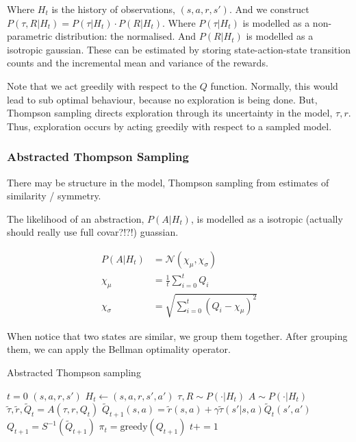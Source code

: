 Where $H_t$ is the history of observations, $(s, a, r, s')$.
And we construct $P(\tau, R | H_t) = P(\tau | H_t) \cdot P(R | H_t)$. Where $P(\tau | H_t)$
is modelled as a non-parametric distribution: the normalised.
And $P(R | H_t)$ is modelled as a isotropic gaussian.
These can be estimated by storing state-action-state transition counts
and the incremental mean and variance of the rewards.

Note that we act greedily with respect to the $Q$ function. Normally, this would
lead to sub optimal behaviour, because no exploration is being done. But, Thompson sampling
directs exploration through its uncertainty in the model, $\tau, r$. Thus,
exploration occurs by acting greedily with respect to a sampled model.

\subsubsection{Abstracted Thompson Sampling}

There may be structure in the model,
Thompson sampling from estimates of similarity / symmetry.

The likelihood of an abstraction, $P(A|H_t)$, is modelled as a isotropic (actually should really use full covar?!?!) guassian.

\begin{align*}
	P(A|H_t) &= \mathcal N(\chi_{\mu}, \chi_{\sigma}) \\
	\chi_{\mu} &= \frac{1}{t}\sum_{i=0}^t Q_i \tag{mean} \\
	\chi_{\sigma} &= \sqrt{\sum_{i=0}^t (Q_i - \chi_{\mu})^2} \tag{standard deviation}
\end{align*}

When notice that two states are similar, we group them together. After grouping them, we can apply the Bellman optimality operator.

\begin{algorithm}
	\caption{Abstracted Thompson sampling}
	\begin{algorithmic}[1]

		\State $t=0$
		\State $(s, a, r, s')$ 
		\State $H_t \leftarrow (s, a, r, s', a')$ 
		\State $\tau, R \sim P(\cdot | H_t)$ 
		\State $A \sim P(\cdot | H_t)$ 
		\State $\tilde \tau, \tilde r, \tilde Q_t = A(\tau, r, Q_t)$ 
		\State $\tilde Q_{t+1}(s, a) = \tilde r(s, a) + \gamma \tilde \tau(s'| s, a) \tilde Q_t(s', a')$ 
		\State $Q_{t+1} = S^{-1}(\tilde Q_{t+1})$ 
		\State $\pi_t = \text{greedy}(Q_{t+1})$ 
		\State $t += 1$

		\EndWhile
		\State {}
		\EndProcedure

	\end{algorithmic}
\end{algorithm}

